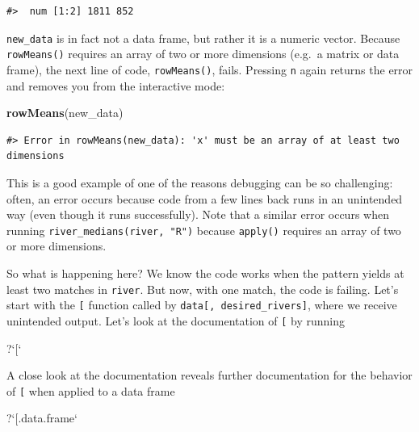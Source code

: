 \documentclass[
]{book}
\newenvironment{Shaded}{\begin{snugshade}}{\end{snugshade}}
\newcommand{\DataTypeTok}[1]{\textcolor[rgb]{0.13,0.29,0.53}{#1}}
\newcommand{\KeywordTok}[1]{\textcolor[rgb]{0.13,0.29,0.53}{\textbf{#1}}}
\newcommand{\NormalTok}[1]{#1}
\newcommand{\StringTok}[1]{\textcolor[rgb]{0.31,0.60,0.02}{#1}}
\begin{document}
\begin{verbatim}
#>  num [1:2] 1811 852
\end{verbatim}

\texttt{new\_data} is in fact not a data frame, but rather it is a numeric vector. Because \texttt{rowMeans()} requires an array of two or more dimensions (e.g.~a matrix or data frame), the next line of code, \texttt{rowMeans()}, fails. Pressing \texttt{n} again returns the error and removes you from the interactive mode:

\begin{Shaded}
\begin{Highlighting}[]
\KeywordTok{rowMeans}\NormalTok{(new_data)}
\end{Highlighting}
\end{Shaded}

\begin{verbatim}
#> Error in rowMeans(new_data): 'x' must be an array of at least two dimensions
\end{verbatim}

This is a good example of one of the reasons debugging can be so challenging: often, an error occurs because code from a few lines back runs in an unintended way (even though it runs successfully). Note that a similar error occurs when running \texttt{river\_medians(river,\ "R")} because \texttt{apply()} requires an array of two or more dimensions.

So what is happening here? We know the code works when the pattern yields at least two matches in \texttt{river}. But now, with one match, the code is failing. Let's start with the \texttt{{[}} function called by \texttt{data{[},\ desired\_rivers{]}}, where we receive unintended output. Let's look at the documentation of \texttt{{[}} by running

\begin{Shaded}
\begin{Highlighting}[]
\NormalTok{?}\StringTok{`}\DataTypeTok{[}\StringTok{`}
\end{Highlighting}
\end{Shaded}

A close look at the documentation reveals further documentation for the behavior of \texttt{{[}} when applied to a data frame

\begin{Shaded}
\begin{Highlighting}[]
\NormalTok{?}\StringTok{`}\DataTypeTok{[.data.frame}\StringTok{`}
\end{Highlighting}
\end{Shaded}
\end{document}
